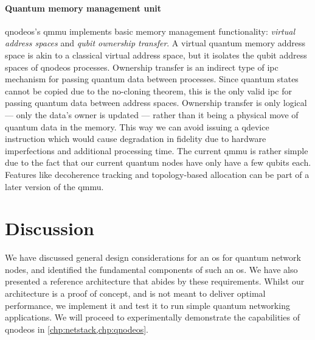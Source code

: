 \paragraph{Quantum memory management unit}

\acrshort{qnodeos}'s \acrshort{qmmu} implements basic memory management functionality: \emph{virtual
address spaces} and \emph{qubit ownership transfer}. A virtual quantum memory address space is akin
to a classical virtual address space, but it isolates the qubit address spaces of \acrshort{qnodeos}
processes. Ownership transfer is an indirect type of \acrfull{ipc} mechanism for passing quantum
data between processes. Since quantum states cannot be copied due to the no-cloning theorem, this is
the only valid \acrshort{ipc} for passing quantum data between address spaces. Ownership transfer is
only logical --- only the data's owner is updated --- rather than it being a physical move of
quantum data in the memory. This way we can avoid issuing a \acrshort{qdevice} instruction which
would cause degradation in fidelity due to hardware imperfections and additional processing time.
The current \acrshort{qmmu} is rather simple due to the fact that our current quantum nodes have
only have a few qubits each. Features like decoherence tracking and topology-based allocation can be
part of a later version of the \acrshort{qmmu}.

\section{Discussion}

We have discussed general design considerations for an \acrshort{os} for quantum network nodes, and
identified the fundamental components of such an \acrshort{os}. We have also presented a reference
architecture that abides by these requirements. Whilst our architecture is a proof of concept, and
is not meant to deliver optimal performance, we implement it and test it to run simple quantum
networking applications. We will proceed to experimentally demonstrate the capabilities of
\acrshort{qnodeos} in \cref{chp:netstack,chp:qnodeos}.

\begin{xstretch}
\printbibliography[heading=subbibintoc,title={References},notcategory=noprint]
\end{xstretch}
